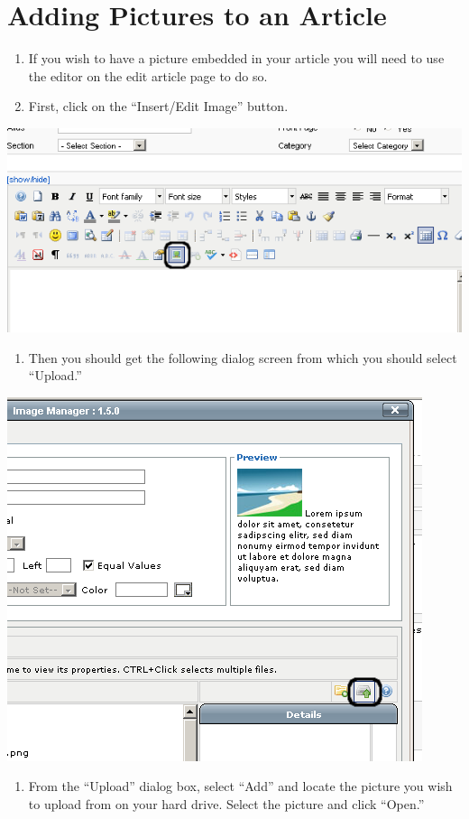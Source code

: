 \documentclass[letterpaper,10pt,english]{manual}
\begin{document}
\section{Adding Pictures to an Article}
\begin{enumerate}
\item {} 
If you wish to have a picture embedded in your article you will need to use the editor on the edit article page to do so.

\item {} 
First, click on the “Insert/Edit Image” button.

\end{enumerate}

{\hfill\includegraphics{articleInsertPictureButton1.png}\hfill}
\begin{enumerate}
\item {} 
Then you should get the following dialog screen from which you should select “Upload.”

\end{enumerate}

{\hfill\includegraphics{articleInsertPictureUpload1.png}\hfill}
\begin{enumerate}
\item {} 
From the “Upload” dialog box, select “Add” and locate the picture you wish to upload from on your hard drive.  Select the picture and click “Open.”

\end{enumerate}
\end{document}
